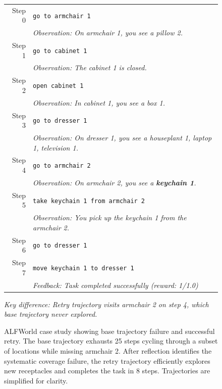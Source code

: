 \begin{figure}[thb]
\begin{tcolorbox}[
    colback=white,
    colframe=black!70,
    title=\textbf{Retry Trajectory (guidance removed for training)},
    fonttitle=\bfseries\small,
    width=\textwidth,
    boxrule=0.5pt
]
\vspace{0.5em}
\footnotesize
\begin{tabularx}{\linewidth}{@{}r@{\hspace{0.8em}}X@{}}
Step 0 & \texttt{go to armchair 1} \\
       & \textit{Observation: On armchair 1, you see a pillow 2.} \\[0.3em]
Step 1 & \texttt{go to cabinet 1} \\
       & \textit{Observation: The cabinet 1 is closed.} \\[0.3em]
Step 2 & \texttt{open cabinet 1} \\
       & \textit{Observation: In cabinet 1, you see a box 1.} \\[0.3em]
Step 3 & \texttt{go to dresser 1} \\
       & \textit{Observation: On dresser 1, you see a houseplant 1, laptop 1, television 1.} \\[0.3em]
Step 4 & \texttt{go to armchair 2} \\
       & \textit{Observation: On armchair 2, you see a \textbf{keychain 1}.} \\[0.3em]
Step 5 & \texttt{take keychain 1 from armchair 2} \\
       & \textit{Observation: You pick up the keychain 1 from the armchair 2.} \\[0.3em]
Step 6 & \texttt{go to dresser 1} \\[0.3em]
Step 7 & \texttt{move keychain 1 to dresser 1} \\
       & \textit{Feedback: Task completed successfully (reward: 1/1.0)} \\
\end{tabularx}

\vspace{0.3em}
\textit{Key difference: Retry trajectory visits armchair 2 on step 4, which base trajectory never explored.}

\end{tcolorbox}

\caption{ALFWorld case study showing base trajectory failure and successful retry. The base trajectory exhausts 25 steps cycling through a subset of locations while missing armchair 2. After reflection identifies the systematic coverage failure, the retry trajectory efficiently explores new receptacles and completes the task in 8 steps. Trajectories are simplified for clarity.}
\label{fig:case_alfworld}
\end{figure}

